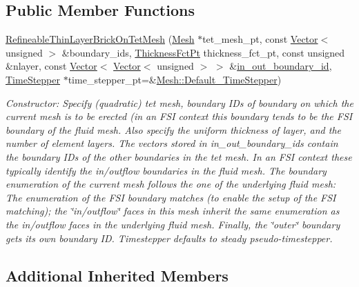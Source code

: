 \subsection*{Public Member Functions}
\begin{DoxyCompactItemize}
\item 
\hyperlink{classoomph_1_1RefineableThinLayerBrickOnTetMesh_a3f1a8807362ae98ae73bbf577e858e51}{Refineable\+Thin\+Layer\+Brick\+On\+Tet\+Mesh} (\hyperlink{classoomph_1_1Mesh}{Mesh} $\ast$tet\+\_\+mesh\+\_\+pt, const \hyperlink{classoomph_1_1Vector}{Vector}$<$ unsigned $>$ \&boundary\+\_\+ids, \hyperlink{classoomph_1_1RefineableThinLayerBrickOnTetMesh_a744583cb70486874441d5a748f23168d}{Thickness\+Fct\+Pt} thickness\+\_\+fct\+\_\+pt, const unsigned \&nlayer, const \hyperlink{classoomph_1_1Vector}{Vector}$<$ \hyperlink{classoomph_1_1Vector}{Vector}$<$ unsigned $>$ $>$ \&\hyperlink{classoomph_1_1ThinLayerBrickOnTetMesh_a3cfd55eb5bbd6801e9d4cd271e602cd8}{in\+\_\+out\+\_\+boundary\+\_\+id}, \hyperlink{classoomph_1_1TimeStepper}{Time\+Stepper} $\ast$time\+\_\+stepper\+\_\+pt=\&\hyperlink{classoomph_1_1Mesh_a12243d0fee2b1fcee729ee5a4777ea10}{Mesh\+::\+Default\+\_\+\+Time\+Stepper})
\begin{DoxyCompactList}\small\item\em Constructor\+: Specify (quadratic) tet mesh, boundary I\+Ds of boundary on which the current mesh is to be erected (in an F\+SI context this boundary tends to be the F\+SI boundary of the fluid mesh. Also specify the uniform thickness of layer, and the number of element layers. The vectors stored in in\+\_\+out\+\_\+boundary\+\_\+ids contain the boundary I\+Ds of the other boundaries in the tet mesh. In an F\+SI context these typically identify the in/outflow boundaries in the fluid mesh. The boundary enumeration of the current mesh follows the one of the underlying fluid mesh\+: The enumeration of the F\+SI boundary matches (to enable the setup of the F\+SI matching); the \char`\"{}in/outflow\char`\"{} faces in this mesh inherit the same enumeration as the in/outflow faces in the underlying fluid mesh. Finally, the \char`\"{}outer\char`\"{} boundary gets its own boundary ID. Timestepper defaults to steady pseudo-\/timestepper. \end{DoxyCompactList}\end{DoxyCompactItemize}
\subsection*{Additional Inherited Members}


